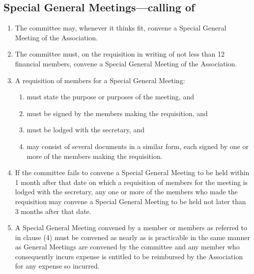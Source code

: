 \documentclass{article}
\begin{document}
\subsection{Special General Meetings—calling of}
\begin{enumerate}
  \item The committee may, whenever it thinks fit, convene a Special General Meeting of the Association.
  \item The committee must, on the requisition in writing of not less than 12 financial members, convene a Special General Meeting of the Association.
  \item A requisition of members for a Special General Meeting:
    \begin{enumerate}
      \item must state the purpose or purposes of the meeting, and
      \item must be signed by the members making the requisition, and
      \item must be lodged with the secretary, and
      \item may consist of several documents in a similar form, each signed by one or more of the members making the requisition.
    \end{enumerate}
  \item If the committee fails to convene a Special General Meeting to be held within 1 month after that date on which a requisition of members for the meeting is lodged with the secretary, any one or more of the members who made the requisition may convene a Special General Meeting to be held not later than 3 months after that date.
  \item A Special General Meeting convened by a member or members as referred to in clause (4) must be convened as nearly as is practicable in the same manner as General Meetings are convened by the committee and any member who consequently incurs expense is entitled to be reimbursed by the Association for any expense so incurred.
\end{enumerate}
\end{document}
